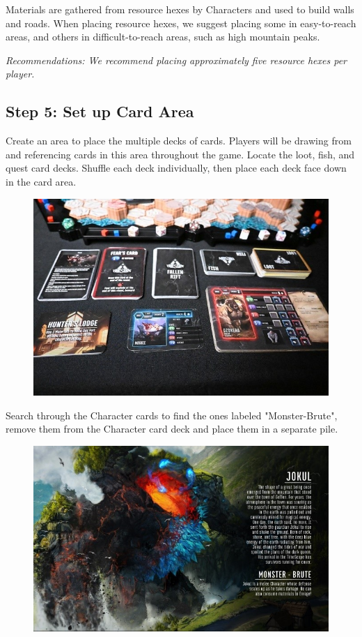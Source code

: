 \documentclass[../main.tex]{subfiles}
\begin{document}
Materials are gathered from resource hexes by Characters and used to build walls and roads. When placing resource hexes, we suggest placing some in easy-to-reach areas, and others in difficult-to-reach areas, such as high mountain peaks. 

\textit{Recommendations: We recommend placing approximately five resource hexes per player. }

\subsection{Step 5:  Set up Card Area}
Create an area to place the multiple decks of cards. Players will be drawing from and referencing cards in this area throughout the game. Locate the loot, fish, and quest card decks. Shuffle each deck individually, then place each deck face down in the card area.

\begin{figure}[h]
    \centering
    \includegraphics[width=1\linewidth]{chapters//boardsetup/TimeStrikeCardPlacement.jpg}
\end{figure}

Search through the Character cards to find the ones labeled "Monster-Brute", remove them from the Character card deck and place them in a separate pile.

\begin{figure}[h]
    \centering
    \includegraphics[width=1\linewidth]{chapters//boardsetup/TimeStrikeCharacterCardMonster.jpg}   
\end{figure}
\end{document}
